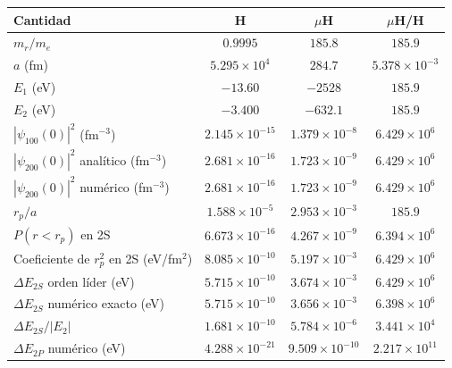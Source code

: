 \begin{tabular}{lccc}
\toprule
Cantidad & H & $\mu$H & $\mu$H/H \\
\midrule
$m_r/m_e$ & $0.9995$ & $185.8$ & $185.9$ \\
$a$ (fm) & $5.295\times10^{4}$ & $284.7$ & $5.378\times10^{-3}$ \\
$E_1$ (eV) & $-13.60$ & $-2528$ & $185.9$ \\
$E_2$ (eV) & $-3.400$ & $-632.1$ & $185.9$ \\
$|\psi_{100}(0)|^2$ (fm$^{-3}$) & $2.145\times10^{-15}$ & $1.379\times10^{-8}$ & $6.429\times10^{6}$ \\
$|\psi_{200}(0)|^2$ anal\'itico (fm$^{-3}$) & $2.681\times10^{-16}$ & $1.723\times10^{-9}$ & $6.429\times10^{6}$ \\
$|\psi_{200}(0)|^2$ num\'erico (fm$^{-3}$) & $2.681\times10^{-16}$ & $1.723\times10^{-9}$ & $6.429\times10^{6}$ \\
$r_p/a$ & $1.588\times10^{-5}$ & $2.953\times10^{-3}$ & $185.9$ \\
$P(r<r_p)$ en 2S & $6.673\times10^{-16}$ & $4.267\times10^{-9}$ & $6.394\times10^{6}$ \\
Coeficiente de $r_p^2$ en 2S (eV/fm$^2$) & $8.085\times10^{-10}$ & $5.197\times10^{-3}$ & $6.429\times10^{6}$ \\
$\Delta E_{2S}$ orden l\'ider (eV) & $5.715\times10^{-10}$ & $3.674\times10^{-3}$ & $6.429\times10^{6}$ \\
$\Delta E_{2S}$ num\'erico exacto (eV) & $5.715\times10^{-10}$ & $3.656\times10^{-3}$ & $6.398\times10^{6}$ \\
$\Delta E_{2S}/|E_2|$ & $1.681\times10^{-10}$ & $5.784\times10^{-6}$ & $3.441\times10^{4}$ \\
$\Delta E_{2P}$ num\'erico (eV) & $4.288\times10^{-21}$ & $9.509\times10^{-10}$ & $2.217\times10^{11}$ \\
\bottomrule
\end{tabular}
